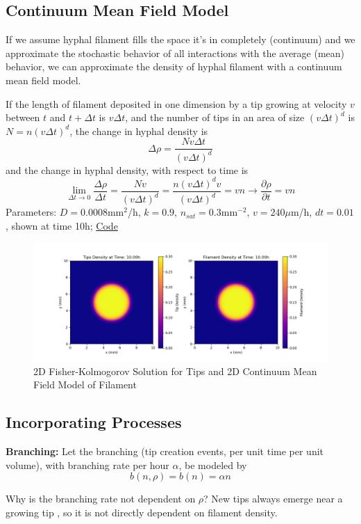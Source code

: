 \documentclass{article}
\begin{document}
\subsection{Continuum Mean Field Model}
If we assume hyphal filament fills the space it's in completely (continuum) and we approximate the stochastic behavior of all interactions with the average (mean) behavior, we can approximate the density of hyphal filament with a continuum mean field model. 

If the length of filament deposited in one dimension by a tip growing at velocity $v$ between $t$ and $t + \Delta t$ is $v\Delta t$, and the number of tips in an area of size $(v\Delta t)^d$ is $N = n(v\Delta t)^d$,
the change in hyphal density is
\[ \Delta \rho = \frac{Nv\Delta t}{(v\Delta t)^d}\]
and the change in hyphal density, with respect to time is
\[ \lim_{\Delta t \rightarrow 0} \frac{\Delta\rho}{\Delta t} = \frac{Nv}{(v\Delta t)^d} = \frac{n(v\Delta t)^d v}{(v\Delta t)^d} = vn \longrightarrow \frac{\partial \rho}{\partial t} = vn \]
Parameters: $D = 0.0008 $mm$^2$/h, $k = 0.9$, $n_{sat} = 0.3$mm$^{-2}$, $v =240 \mu$m/h, $dt = 0.01$, shown at time 10h; \hyperlink{fk_2d_withFilament}{Code}
\begin{figure}[h]
    \centering
    \includegraphics[width=0.9\linewidth]{FK_2D_wFilament.png}
    \caption{2D Fisher-Kolmogorov Solution for Tips and 2D Continuum Mean Field Model of Filament}
    \label{fig:enter-label}
\end{figure}

\subsection{Incorporating Processes}
\textbf{Branching: } Let the branching (tip creation events, per unit time per unit volume), with branching rate per hour $\alpha$, be modeled by \[b(n,\rho) = b(n) = \alpha n\]

Why is the branching rate not dependent on $\rho$? New tips always emerge near a growing tip \cite{Oyarte2025travelling}, so it is not directly dependent on filament density.
\end{document}
